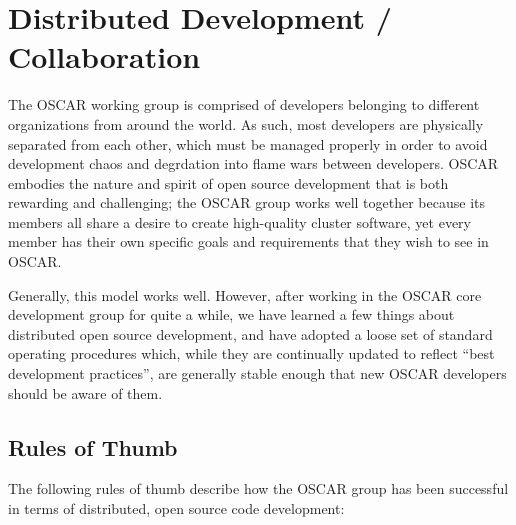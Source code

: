 %
%
%

\section{Distributed Development / Collaboration}
\label{sec:collaboration}

The OSCAR working group is comprised of developers belonging to
different organizations from around the world.  As such, most
developers are physically separated from each other, which must be
managed properly in order to avoid development chaos and degrdation
into flame wars between developers.
% 
OSCAR embodies the nature and spirit of open source development that
is both rewarding and challenging; the OSCAR group works well together
because its members all share a desire to create high-quality cluster
software, yet every member has their own specific goals and
requirements that they wish to see in OSCAR.

Generally, this model works well.  However, after working in the OSCAR
core development group for quite a while, we have learned a few things
about distributed open source development, and have adopted a loose
set of standard operating procedures which, while they are continually
updated to reflect ``best development practices'', are generally
stable enough that new OSCAR developers should be aware of them.


\subsection{Rules of Thumb}

The following rules of thumb describe how the OSCAR group has been
successful in terms of distributed, open source code development:

